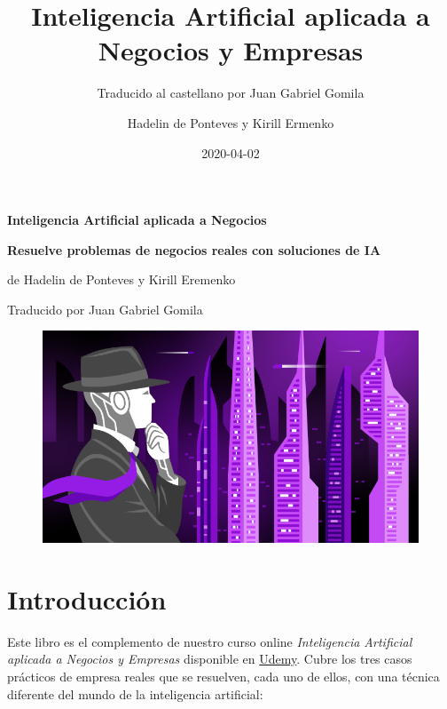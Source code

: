 \documentclass[]{book}
\title{Inteligencia Artificial aplicada a Negocios y Empresas}
\subtitle{Traducido al castellano por Juan Gabriel Gomila}
\author{Hadelin de Ponteves y Kirill Ermenko}
\date{2020-04-02}
\begin{document}
\maketitle


\begin{titlepage}

\begin{center}

\Huge \textbf{Inteligencia Artificial aplicada a Negocios}

\Large \textbf{Resuelve problemas de negocios reales con soluciones de IA}

\large de Hadelin de Ponteves y Kirill Eremenko

\large Traducido por Juan Gabriel Gomila


\end{center}

\begin{figure}[!htbp]
		\begin{center}
			\includegraphics{Images/Course_Image.png}
		\end{center}
\end{figure}

\end{titlepage}

\renewcommand{\contentsname}{Tabla de Contenidos}
{
\setcounter{tocdepth}{1}
\tableofcontents
}

\newpage

\hypertarget{introducciuxf3n}{%
\chapter*{Introducción}\label{introducciuxf3n}}

Este libro es el complemento de nuestro curso online \emph{Inteligencia Artificial aplicada a Negocios y Empresas} disponible en \href{https://www.udemy.com/ia4business/?couponCode=THEBOOK}{Udemy}. Cubre los tres casos prácticos de empresa reales que se resuelven, cada uno de ellos, con una técnica diferente del mundo de la inteligencia artificial:
\end{document}
